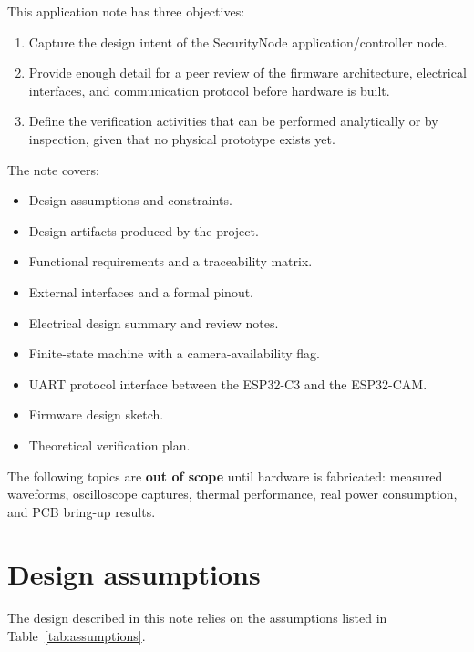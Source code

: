 \documentclass[11pt,a4paper]{article}
\begin{document}
This application note has three objectives:

\begin{enumerate}
    \item Capture the design intent of the SecurityNode application/controller node.
    \item Provide enough detail for a peer review of the firmware architecture,
        electrical interfaces, and communication protocol before hardware is built.
    \item Define the verification activities that can be performed analytically
        or by inspection, given that no physical prototype exists yet.
\end{enumerate}

The note covers:

\begin{itemize}
    \item Design assumptions and constraints.
    \item Design artifacts produced by the project.
    \item Functional requirements and a traceability matrix.
    \item External interfaces and a formal pinout.
    \item Electrical design summary and review notes.
    \item Finite-state machine with a camera-availability flag.
    \item UART protocol interface between the ESP32-C3 and the ESP32-CAM.
    \item Firmware design sketch.
    \item Theoretical verification plan.
\end{itemize}

The following topics are \textbf{out of scope} until hardware is fabricated:
measured waveforms, oscilloscope captures, thermal performance, real power
consumption, and PCB bring-up results.

\section{Design assumptions}

The design described in this note relies on the assumptions listed in
Table~\ref{tab:assumptions}.
\end{document}
